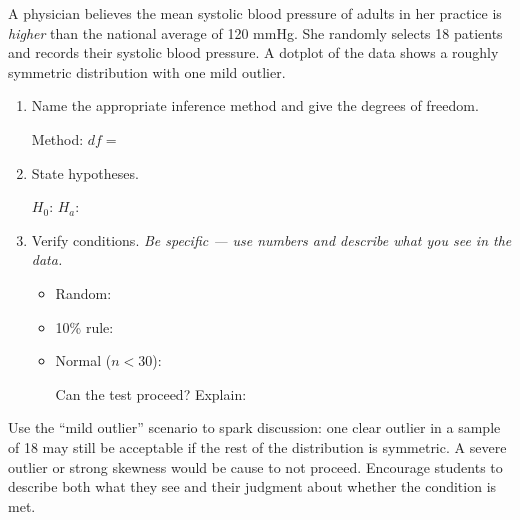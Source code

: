 \documentclass[10pt]{article}
\begin{document}
\namedateperiod

\vspace{0.15in}

A physician believes the mean systolic blood pressure of adults in her practice is
\emph{higher} than the national average of 120 mmHg. She randomly selects 18 patients
and records their systolic blood pressure. A dotplot of the data shows a roughly symmetric
distribution with one mild outlier.

\begin{enumerate}
  \item Name the appropriate inference method and give the degrees of freedom.

        Method:  \quad $df = $ 

  \item State hypotheses.

        $H_0$:  \quad $H_a$: 

  \item Verify conditions. \textit{Be specific --- use numbers and describe what you see in the data.}
        \begin{itemize}
          \item Random: 
          \item 10\% rule: 
          \item Normal ($n < 30$): 

                Can the test proceed?  \quad Explain: 
        \end{itemize}
\end{enumerate}

\begin{teachernote}
Use the ``mild outlier'' scenario to spark discussion: one clear outlier in a sample of 18
may still be acceptable if the rest of the distribution is symmetric. A severe outlier or
strong skewness would be cause to not proceed. Encourage students to describe both what they
see and their judgment about whether the condition is met.
\end{teachernote}
\end{document}
